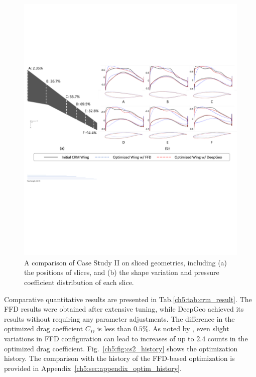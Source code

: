 \begin{figure}[!h]
    \begin{center}
        \includegraphics[width=1\linewidth]{chapter5/fig/crm_optim_slice.pdf}
    \end{center}
    \caption{
        \small A comparison of Case Study II on sliced geometries, including (a) the positions of slices, and (b) the shape variation and pressure coefficient distribution of each slice.
    }
    \label{ch5:fig:cs2_slice}
\end{figure}

Comparative quantitative results are presented in Tab.\ref{ch5:tab:crm_result}. The FFD results were obtained after extensive tuning, while DeepGeo achieved its results without requiring any parameter adjustments. 
The difference in the optimized drag coefficient $C_D$ is less than $0.5\%$. As noted by \citet{aa.Lyu2015}, even slight variations in FFD configuration can lead to increases of up to $2.4$ counts in the optimized drag coefficient.
Fig.~\ref{ch5:fig:cs2_history} shows the optimization history. The comparison with the history of the FFD-based optimization is provided in Appendix~\ref{ch5:sec:appendix_optim_history}.

